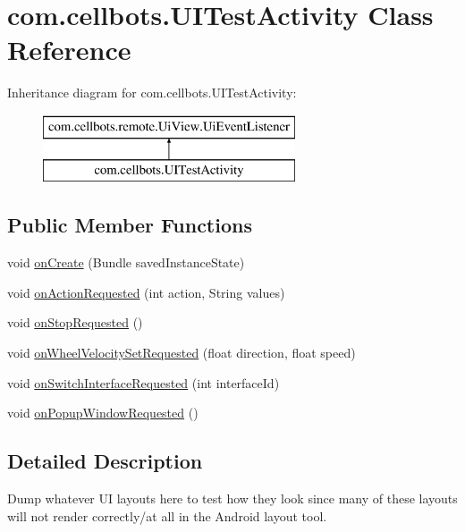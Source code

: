 \hypertarget{classcom_1_1cellbots_1_1_u_i_test_activity}{\section{com.\-cellbots.\-U\-I\-Test\-Activity Class Reference}
\label{classcom_1_1cellbots_1_1_u_i_test_activity}
}
Inheritance diagram for com.\-cellbots.\-U\-I\-Test\-Activity\-:\begin{figure}[H]
\begin{center}
\leavevmode
\includegraphics[height=2.000000cm]{classcom_1_1cellbots_1_1_u_i_test_activity}
\end{center}
\end{figure}
\subsection*{Public Member Functions}
\begin{DoxyCompactItemize}
\item 
void \hyperlink{classcom_1_1cellbots_1_1_u_i_test_activity_a3a8336cdbb2fccb5d5110e3edd642c10}{on\-Create} (Bundle saved\-Instance\-State)
\item 
void \hyperlink{classcom_1_1cellbots_1_1_u_i_test_activity_a7cd0909b4b93c86d9d20e180ffd4d32a}{on\-Action\-Requested} (int action, String values)
\item 
void \hyperlink{classcom_1_1cellbots_1_1_u_i_test_activity_a625529f4b75b89335ec320937ed9dccb}{on\-Stop\-Requested} ()
\item 
void \hyperlink{classcom_1_1cellbots_1_1_u_i_test_activity_af57b00c232e50f0be0010f3b0799fa1a}{on\-Wheel\-Velocity\-Set\-Requested} (float direction, float speed)
\item 
void \hyperlink{classcom_1_1cellbots_1_1_u_i_test_activity_a8efb2b9764600a6507ec26c4dab3e858}{on\-Switch\-Interface\-Requested} (int interface\-Id)
\item 
void \hyperlink{classcom_1_1cellbots_1_1_u_i_test_activity_a2ff5c73adfb1f86f31cc065bae92c95b}{on\-Popup\-Window\-Requested} ()
\end{DoxyCompactItemize}


\subsection{Detailed Description}
Dump whatever U\-I layouts here to test how they look since many of these layouts will not render correctly/at all in the Android layout tool.

